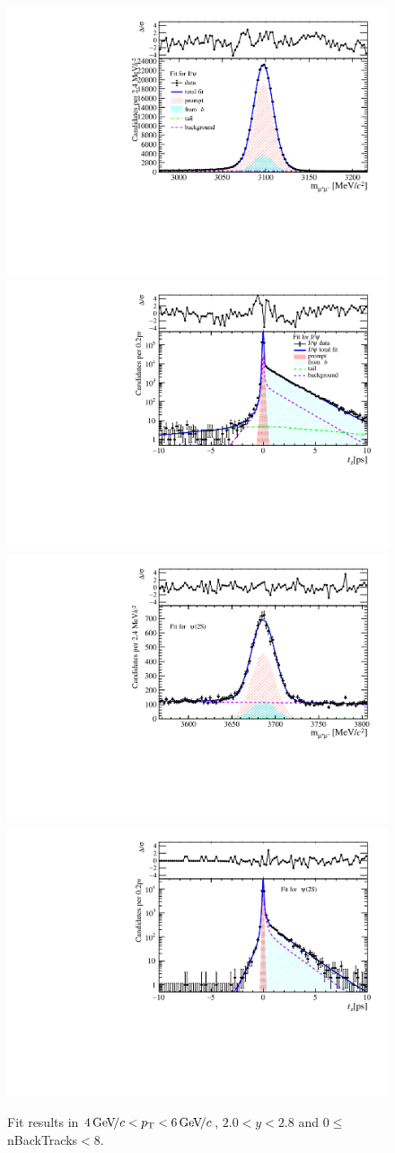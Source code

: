 \begin{figure}[H]
\begin{center}
\includegraphics[width=0.47\linewidth]{pdf/Jpsi/drawmassB/n1y1pt3.pdf}
\includegraphics[width=0.47\linewidth]{pdf/Jpsi/2DFitB/n1y1pt3.pdf}
\vspace*{-0.5cm}
\includegraphics[width=0.47\linewidth]{pdf/Psi2S/drawmassB/n1y1pt3.pdf}
\includegraphics[width=0.47\linewidth]{pdf/Psi2S/2DFitB/n1y1pt3.pdf}
\vspace*{-0.5cm}
\end{center}
\caption{Fit results in $4\text{\,Ge\kern -0.1em V\!/}c<p_{\mathrm{T}}<6\text{\,Ge\kern -0.1em V\!/}c$, $2.0<y<2.8$ and 0$\leq$nBackTracks$<$8.}
\label{Fitn1y1pt3}
\end{figure}
